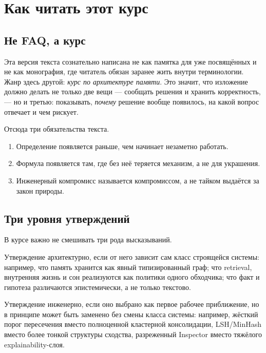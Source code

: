 \chapter{Как читать этот курс}

\section{Не FAQ, а курс}

Эта версия текста сознательно написана не как памятка для уже посвящённых и не как
монография, где читатель обязан заранее жить внутри терминологии. Жанр здесь другой:
\emph{курс по архитектуре памяти}. Это значит, что изложение должно делать не только
две вещи — сообщать решения и хранить корректность, — но и третью: показывать,
\emph{почему} решение вообще появилось, на какой вопрос отвечает и чем рискует.

Отсюда три обязательства текста.
\begin{enumerate}
\item Определение появляется раньше, чем начинает незаметно работать.
\item Формула появляется там, где без неё теряется механизм, а не для украшения.
\item Инженерный компромисс называется компромиссом, а не тайком выдаётся за закон природы.
\end{enumerate}

\section{Три уровня утверждений}

В курсе важно не смешивать три рода высказываний.

\begin{definition}
Утверждение архитектурно, если от него зависит сам класс строящейся системы:
например, что память хранится как явный типизированный граф; что retrieval,
внутренняя жизнь и сон реализуются как политики одного обходчика; что факт и
гипотеза различаются эпистемически, а не только текстово.
\end{definition}

\begin{definition}
Утверждение инженерно, если оно выбрано как первое рабочее приближение, но в
принципе может быть заменено без смены класса системы: например, жёсткий порог
пересечения вместо полноценной кластерной консолидации, LSH/MinHash вместо более
тонкой структуры сходства, разреженный Inspector вместо тяжёлого explainability-слоя.
\end{definition}

